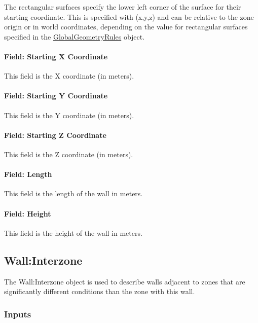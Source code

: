 The rectangular surfaces specify the lower left corner of the surface for their starting coordinate. This is specified with (x,y,z) and can be relative to the zone origin or in world coordinates, depending on the value for rectangular surfaces specified in the \hyperref[globalgeometryrules]{GlobalGeometryRules} object.

\paragraph{Field: Starting X Coordinate}\label{field-starting-x-coordinate-2}

This field is the X coordinate (in meters).

\paragraph{Field: Starting Y Coordinate}\label{field-starting-y-coordinate-2}

This field is the Y coordinate (in meters).

\paragraph{Field: Starting Z Coordinate}\label{field-starting-z-coordinate-2}

This field is the Z coordinate (in meters).

\paragraph{Field: Length}\label{field-length-2}

This field is the length of the wall in meters.

\paragraph{Field: Height}\label{field-height-2}

This field is the height of the wall in meters.

\subsection{Wall:Interzone}\label{wallinterzone}

The Wall:Interzone object is used to describe walls adjacent to zones that are significantly different conditions than the zone with this wall.

\subsubsection{Inputs}\label{inputs-7-028}

